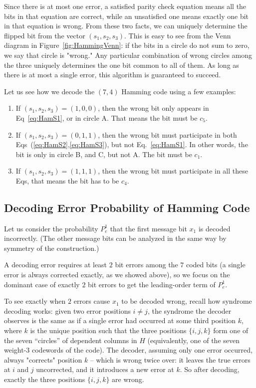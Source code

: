 Since there is at most one error, a satisfied parity check equation means all the bits in that equation are correct, while an unsatisfied one means exactly one bit in that equation is wrong. From these two facts, we can uniquely determine the flipped bit from the vector \((s_1, s_2, s_3)\). This is easy to see from the Venn diagram in Figure~\ref{fig:HammingVenn}: if the bits in a circle do not sum to zero, we say that circle is "wrong." Any particular combination of wrong circles among the three uniquely determines the one bit common to all of them. As long as there is at most a single error, this algorithm is guaranteed to succeed. 

\begin{example}
Let us see how we decode the \((7,4)\) Hamming code using a few examples:
\begin{enumerate}
    \item If \((s_1, s_2, s_3) = (1,0,0)\), then the wrong bit only appears in Eq~\ref{eq:HamS1}, or in circle A. That means the bit must be \(c_5\).
    \item If \((s_1, s_2, s_3) = (0,1,1)\), then the wrong bit must participate in both Eqs~(\ref{eq:HamS2},\ref{eq:HamS3}), but not Eq.~\ref{eq:HamS1}. In other words, the bit is only in circle B, and C, but not A. The bit must be \(c_1\).

     \item If \((s_1, s_2, s_3) = (1,1,1)\), then the wrong bit must participate in all these Eqs, that means the bit has to be \(c_4\).
\end{enumerate}
\end{example}


\subsection{Decoding Error Probability of Hamming Code}
Let us consider the probability \(P_e^1\) that the first message bit \(x_1\) is decoded incorrectly. (The other message bits can be analyzed in the same way by symmetry of the construction.)

A decoding error requires at least \(2\) bit errors among the \(7\) coded bits (a single error is always corrected exactly, as we showed above), so we focus on the dominant case of exactly \(2\) bit errors to get the leading-order term of \(P_e^1\).

To see exactly when \(2\) errors cause \(x_1\) to be decoded wrong, recall how syndrome decoding works: given two error positions \(i \neq j\), the syndrome the decoder observes is the same as if a single error had occurred at some third position \(k\), where \(k\) is the unique position such that the three positions \(\{i,j,k\}\) form one of the seven ``circles'' of dependent columns in \(H\) (equivalently, one of the seven weight-\(3\) codewords of the code). The decoder, assuming only one error occurred, always "corrects" position \(k\) -- which is wrong twice over: it leaves the true errors at \(i\) and \(j\) uncorrected, and it introduces a new error at \(k\). So after decoding, exactly the three positions \(\{i,j,k\}\) are wrong.


